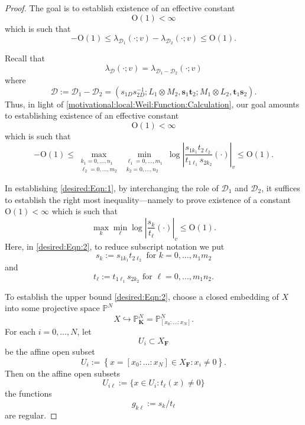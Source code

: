 \documentclass[10pt]{amsart}
\renewcommand{\leq}{\leqslant}
\newcommand{\KK}{\mathbf{K}}
\newcommand{\FF}{\mathbf{F}}
\newcommand{\PP}{\mathbb{P}} %
\theoremstyle{definition}
\numberwithin{equation}{section}
\begin{document}
\begin{proof}

The goal is to establish existence of an effective constant 
$$
\mathrm{O}(1) < \infty 
$$
which is such that 
$$
- \mathrm{O}(1) \leq \lambda_{\mathcal{D}_1}(\cdot;v) - \lambda_{\mathcal{D}_2}(\cdot;v) \leq \mathrm{O}(1) \text{.}
$$

Recall that
$$
\lambda_{\mathcal{D}}(\cdot;v) = \lambda_{\mathcal{D}_1 - \mathcal{D}_2}(\cdot;v) 
$$
where
$$
\mathcal{D} := \mathcal{D}_1 - \mathcal{D}_2 = (s_{1D}s_{2D}^{-1}; L_1 \otimes M_2, \mathbf{s}_1 \mathbf{t}_2; M_1 \otimes L_2, \mathbf{t}_1 \mathbf{s}_2) \text{.}
$$
Thus, in light of \eqref{motivational:local:Weil:Function:Calculation}, 
our goal amounts to establishing existence of an effective constant 
$$\mathrm{O}(1) < \infty$$ 
which is such that
\begin{equation}\label{desired:Eqn:1}
- \mathrm{O}(1) \leq \max_{\substack{k_1 = 0,\dots,n_1 \\
\ell_2 = 0,\dots,m_2}} \min_{\substack{\ell_1 = 0,\dots,m_1 \\ k_2 = 0,\dots,n_2}} \log \left| \frac{s_{1 {k_1}} t_{2 {\ell_2}}  }{  t_{1 {\ell_1}} s_{2 {k_2}}  }(\cdot) \right|_v \leq \mathrm{O}(1) \text{.}
\end{equation}

In establishing \eqref{desired:Eqn:1}, by interchanging the role of $\mathcal{D}_1$ and $\mathcal{D}_2$, it suffices to establish the right most inequality---namely to prove existence of a constant $\mathrm{O}(1) < \infty$ which is such that 
\begin{equation}\label{desired:Eqn:2}
\max_k \min_{\ell} \log \left| \frac{s_k}{t_\ell}(\cdot) \right|_v \leq \mathrm{O}(1) \text{.}
\end{equation} 
Here, in \eqref{desired:Eqn:2}, to reduce subscript notation we put 
$$s_k := s_{1 {k_1}} t_{2 {\ell_2}} \text{ for $k = 0,\dots, n_1m_2$}$$ 
and 
$$t_\ell := t_{1 {\ell_1}} s_{2 {k_2}} \text{ for $\ell = 0,\dots, m_1 n_2$.}$$

To establish the upper bound \eqref{desired:Eqn:2}, choose a closed embedding of $X$ into some projective space $\PP^N$
$$
X \hookrightarrow \PP^N_{\KK} = \PP^N_{[x_0:\dots:x_N]} \text{.}
$$
For each $i=0,\dots,N$, let 
$$U_i \subset X_{\FF}$$ 
be the affine open subset
$$
U_i := \left\{ x = [x_0:\dots : x_N] \in X_{\FF} : x_i \not = 0 \right\} \text{.}
$$
Then on the affine open subsets
$$
U_{i\ell} := \{x \in U_i : t_{\ell}(x) \not = 0 \} 
$$
the functions
$$
g_{k \ell} := s_k / t_{\ell}
$$
are regular.


\end{proof}
\end{document}
